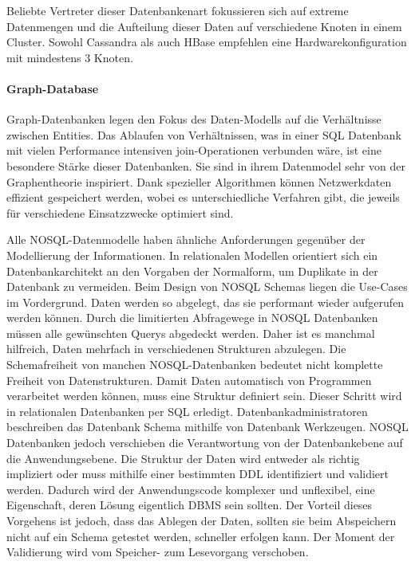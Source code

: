 Beliebte Vertreter dieser Datenbankenart fokussieren sich auf extreme Datenmengen und die Aufteilung dieser Daten auf verschiedene Knoten in einem Cluster. Sowohl Cassandra als auch HBase empfehlen eine Hardwarekonfiguration mit mindestens 3 Knoten.

\paragraph*{Graph-Database}

Graph-Datenbanken legen den Fokus des Daten-Modells auf die Verhältnisse zwischen Entities. Das Ablaufen von Verhältnissen, was in einer SQL Datenbank mit vielen Performance intensiven join-Operationen verbunden wäre, ist eine besondere Stärke dieser Datenbanken. Sie sind in ihrem Datenmodel sehr von der Graphentheorie inspiriert. Dank spezieller Algorithmen können Netzwerkdaten effizient gespeichert werden, wobei es unterschiedliche Verfahren gibt, die jeweils für verschiedene Einsatzzwecke optimiert sind.

Alle NOSQL-Datenmodelle haben ähnliche Anforderungen gegenüber der Modellierung der Informationen. In relationalen Modellen orientiert sich ein Datenbankarchitekt an den Vorgaben der Normalform, um Duplikate in der Datenbank zu vermeiden. Beim Design von NOSQL Schemas liegen die Use-Cases im Vordergrund. Daten werden so abgelegt, das sie performant wieder aufgerufen werden können. Durch die limitierten Abfragewege in NOSQL Datenbanken müssen alle gewünschten Querys abgedeckt werden. Daher ist es manchmal hilfreich, Daten mehrfach in verschiedenen Strukturen abzulegen.
Die Schemafreiheit von manchen NOSQL-Datenbanken bedeutet nicht komplette Freiheit von Datenstrukturen. Damit Daten automatisch von Programmen verarbeitet werden können, muss eine Struktur definiert sein. Dieser Schritt wird in relationalen Datenbanken per SQL erledigt. Datenbankadministratoren beschreiben das Datenbank Schema mithilfe von Datenbank Werkzeugen. NOSQL Datenbanken jedoch verschieben die Verantwortung von der Datenbankebene auf die Anwendungsebene. Die Struktur der Daten wird entweder als richtig impliziert oder muss mithilfe einer bestimmten \ac{DDL} identifiziert und validiert werden. Dadurch wird der Anwendungscode komplexer und unflexibel, eine Eigenschaft, deren Lösung eigentlich DBMS sein sollten. Der Vorteil dieses Vorgehens ist jedoch, dass das Ablegen der Daten, sollten sie beim Abspeichern nicht auf ein Schema getestet werden, schneller erfolgen kann. Der Moment der Validierung wird vom Speicher- zum Lesevorgang verschoben.

